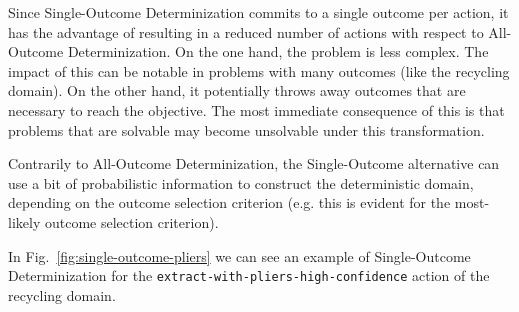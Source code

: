 \documentclass[../root.tex]{subfiles}
\begin{document}
Since Single-Outcome Determinization commits to a single outcome per action, it has
the advantage of resulting in a reduced number of actions with respect to
All-Outcome Determinization. On the one hand, the problem is less complex.
The impact of this can be notable in problems with many outcomes (like the
recycling domain). On the
other hand, it potentially throws away outcomes that are
necessary to reach the objective. The most immediate consequence of this is that
problems that are solvable may become unsolvable under this transformation.

Contrarily to All-Outcome Determinization, the Single-Outcome alternative
can use a bit of probabilistic information to construct the deterministic
domain, depending on the outcome selection criterion (e.g. this is evident
for the most-likely outcome selection criterion).

In Fig.~\ref{fig:single-outcome-pliers} we can
see an example of Single-Outcome Determinization
for the \texttt{extract-with-pliers-high-confidence} action of the
recycling domain.
\end{document}
